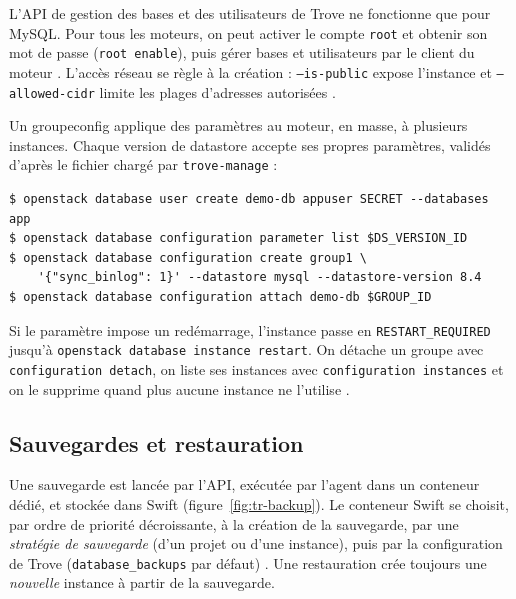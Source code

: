 L'API de gestion des bases et des utilisateurs de Trove ne fonctionne que pour MySQL. Pour tous les moteurs, on peut activer
le compte \texttt{root} et obtenir son mot de passe (\texttt{root enable}), puis gérer bases et utilisateurs par le client du moteur
\parencite{trove-users}. L'accès réseau se règle à la création : \texttt{--is-public} expose l'instance et
\texttt{--allowed-cidr} limite les plages d'adresses autorisées \parencite{trove-create}.

Un \gls{groupeconfig} applique des paramètres au moteur, en masse, à plusieurs instances. Chaque version de datastore accepte ses propres
paramètres, validés d'après le fichier chargé par \texttt{trove-manage} \parencite{trove-config,trove-datastore} :

\par\noindent\begin{minipage}{\linewidth}
\begin{lstlisting}[style=terminal]
$ openstack database user create demo-db appuser SECRET --databases app
$ openstack database configuration parameter list $DS_VERSION_ID
$ openstack database configuration create group1 \
    '{"sync_binlog": 1}' --datastore mysql --datastore-version 8.4
$ openstack database configuration attach demo-db $GROUP_ID
\end{lstlisting}
\end{minipage}\par

Si le paramètre impose un redémarrage, l'instance passe en \texttt{RESTART\_REQUIRED} jusqu'à
\texttt{openstack database instance restart}. On détache un groupe avec \texttt{configuration detach}, on liste ses instances avec
\texttt{configuration instances} et on le supprime quand plus aucune instance ne l'utilise \parencite{trove-config,trove-status}.

\subsection{Sauvegardes et restauration}\label{sec:tr-backup}

Une sauvegarde est lancée par l'API, exécutée par l'agent dans un conteneur dédié, et stockée dans Swift (figure~\ref{fig:tr-backup}).
Le conteneur Swift se choisit, par ordre de priorité décroissante, à la création de la sauvegarde, par une \emph{stratégie de
sauvegarde} (d'un projet ou d'une instance), puis par la configuration de Trove (\texttt{database\_backups} par défaut)
\parencite{trove-backup}. Une restauration crée toujours une \emph{nouvelle} instance à partir de la sauvegarde.


